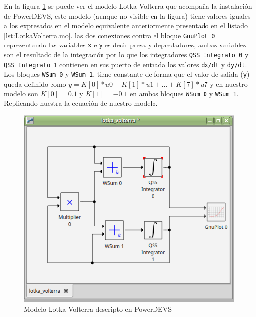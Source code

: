 	En la figura \ref{fig:lk-powerdevs} se puede ver el modelo Lotka Volterra que acompaña la instalación de PowerDEVS, este modelo (aunque no visible en la figura)
	tiene valores iguales a los expresados en el modelo equivalente anteriormente presentado en el listado \ref{lst:LotkaVolterra.mo}. 
	las dos conexiones contra el bloque \texttt{GnuPlot 0} representando las variables \texttt{x} e \texttt{y} es decir presa y depredadores, ambas variables 
	son el resultado de la integración por lo que los integradores \texttt{QSS Integrato 0} y \texttt{QSS Integrato 1} contienen en sus puerto de entrada los 
	valores \texttt{dx/dt} y \texttt{dy/dt}. 
	Los bloques \texttt{WSum 0} y \texttt{WSum 1}, tiene constante de forma que el valor de salida (\texttt{y}) queda definido como
	$y = K[0] * u0 + K[1] * u1 + \dots + K[7] * u7$ y en nuestro modelo son $K[0] = 0.1$ y $K[1] = -0.1$ en ambos bloques \texttt{WSum 0} y \texttt{WSum 1}.
	Replicando nuestra la ecuación de nuestro modelo.
	

	\begin{figure}[!htbp]
	  \includegraphics[width=\textwidth]{lk-powerdevs}
	  \caption{Modelo Lotka Volterra descripto en PowerDEVS}
	   \label{fig:lk-powerdevs}
	\end{figure}

